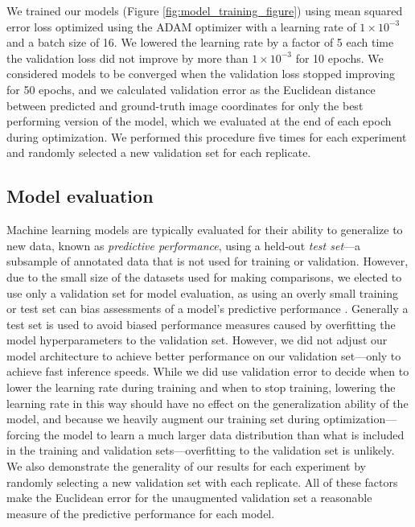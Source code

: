 \documentclass[11pt,a4paper,oneside]{book}
\begin{document}
We trained our models (Figure \ref{fig:model_training_figure}) using mean squared error loss optimized using the ADAM optimizer \citep{kingma2014adam} with a learning rate of $1\times10^{-3}$ and a batch size of 16. We lowered the learning rate by a factor of 5 each time the validation loss did not improve by more than $1\times10^{-3}$ for 10 epochs. We considered models to be converged when the validation loss stopped improving for 50 epochs, and we calculated validation error as the Euclidean distance between predicted and ground-truth image coordinates for only the best performing version of the model, which we evaluated at the end of each epoch during optimization. We performed this procedure five times for each experiment and randomly selected a new validation set for each replicate.

\subsection{Model evaluation}
Machine learning models are typically evaluated for their ability to generalize to new data, known as \textit{predictive performance}, using a held-out \textit{test set}—a subsample of annotated data that is not used for training or validation. However, due to the small size of the datasets used for making comparisons, we elected to use only a validation set for model evaluation, as using an overly small training or test set can bias assessments of a model's predictive performance \citep{kuhn2013applied}. Generally a test set is used to avoid biased performance measures caused by overfitting the model hyperparameters to the validation set. However, we did not adjust our model architecture to achieve better performance on our validation set—only to achieve fast inference speeds. While we did use validation error to decide when to lower the learning rate during training and when to stop training, lowering the learning rate in this way should have no effect on the generalization ability of the model, and because we heavily augment our training set during optimization---forcing the model to learn a much larger data distribution than what is included in the training and validation sets—overfitting to the validation set is unlikely. We also demonstrate the generality of our results for each experiment by randomly selecting a new validation set with each replicate. All of these factors make the Euclidean error for the unaugmented validation set a reasonable measure of the predictive performance for each model. 
\end{document}
